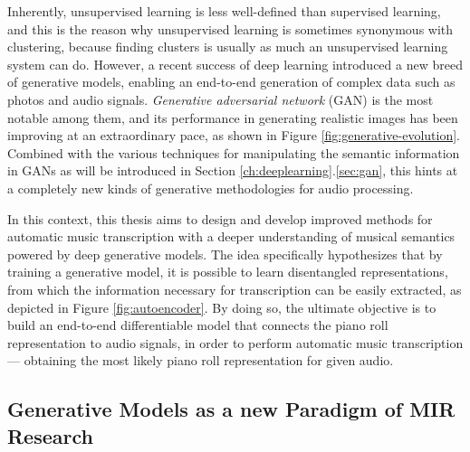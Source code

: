Inherently, unsupervised learning is less well-defined than supervised learning, and this is the reason why unsupervised learning is sometimes synonymous with clustering, because finding clusters is usually as much an unsupervised learning system can do.
However, a recent success of deep learning introduced a new breed of generative models, enabling an end-to-end generation of complex data such as photos and audio signals.
\emph{Generative adversarial network} (GAN) \cite{goodfellow2014gan} is the most notable among them, and its performance in generating realistic images has been improving at an extraordinary pace, as shown in Figure \ref{fig:generative-evolution}.
Combined with the various techniques for manipulating the semantic information in GANs as will be introduced in Section \ref{ch:deeplearning}.\ref{sec:gan}, this hints at a completely new kinds of generative methodologies for audio processing.


In this context, this thesis aims to design and develop improved methods for automatic music transcription with a deeper understanding of musical semantics powered by deep generative models.
The idea specifically hypothesizes that by training a generative model, it is possible to learn disentangled representations, from which the information necessary for transcription can be easily extracted, as depicted in Figure \ref{fig:autoencoder}.
By doing so, the ultimate objective is to build an end-to-end differentiable model that connects the piano roll representation to audio signals, in order to perform automatic music transcription --- obtaining the most likely piano roll representation for given audio.

\iffalse

\subsection{Generative Models as a new Paradigm of MIR Research}

